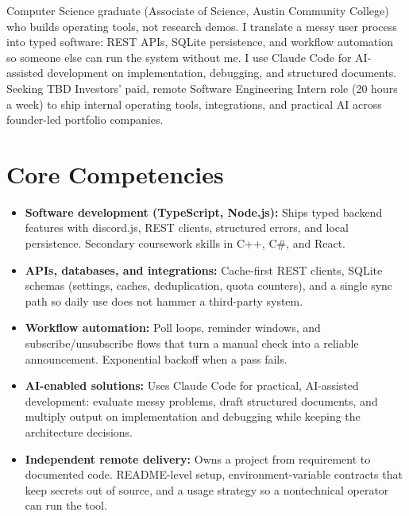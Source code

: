 \documentclass[11pt,a4paper,sans]{moderncv}
\begin{document}

\makecvtitle


\vspace{6pt}
\small{Computer Science graduate (Associate of Science, Austin Community College) who builds operating tools, not research demos. I translate a messy user process into typed software: REST APIs, SQLite persistence, and workflow automation so someone else can run the system without me. I use Claude Code for AI-assisted development on implementation, debugging, and structured documents. Seeking TBD Investors' paid, remote Software Engineering Intern role (20 hours a week) to ship internal operating tools, integrations, and practical AI across founder-led portfolio companies.}


\section{Core Competencies}
\vspace{1pt}
\begin{itemize}

\item \textbf{Software development (TypeScript, Node.js):} Ships typed backend features with discord.js, REST clients, structured errors, and local persistence. Secondary coursework skills in C++, C\#, and React.

\item \textbf{APIs, databases, and integrations:} Cache-first REST clients, SQLite schemas (settings, caches, deduplication, quota counters), and a single sync path so daily use does not hammer a third-party system.

\item \textbf{Workflow automation:} Poll loops, reminder windows, and subscribe/unsubscribe flows that turn a manual check into a reliable announcement. Exponential backoff when a pass fails.

\item \textbf{AI-enabled solutions:} Uses Claude Code for practical, AI-assisted development: evaluate messy problems, draft structured documents, and multiply output on implementation and debugging while keeping the architecture decisions.

\item \textbf{Independent remote delivery:} Owns a project from requirement to documented code. README-level setup, environment-variable contracts that keep secrets out of source, and a usage strategy so a nontechnical operator can run the tool.

\end{itemize}
\end{document}
